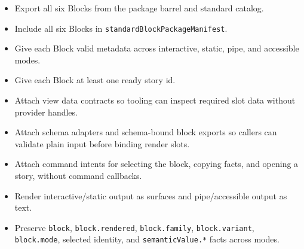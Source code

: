 \begin{itemize}
\tightlist
\item
  Export all six Blocks from the package barrel and standard catalog.
\item
  Include all six Blocks in \texttt{s\allowbreak{}t\allowbreak{}a\allowbreak{}n\allowbreak{}d\allowbreak{}a\allowbreak{}r\allowbreak{}d\allowbreak{}B\allowbreak{}l\allowbreak{}o\allowbreak{}c\allowbreak{}k\allowbreak{}P\allowbreak{}a\allowbreak{}c\allowbreak{}k\allowbreak{}a\allowbreak{}g\allowbreak{}e\allowbreak{}M\allowbreak{}a\allowbreak{}n\allowbreak{}i\allowbreak{}f\allowbreak{}e\allowbreak{}s\allowbreak{}t}.
\item
  Give each Block valid metadata across interactive, static, pipe, and accessible modes.
\item
  Give each Block at least one ready story id.
\item
  Attach view data contracts so tooling can inspect required slot data without provider handles.
\item
  Attach schema adapters and schema-bound block exports so callers can validate plain input before binding render slots.
\item
  Attach command intents for selecting the block, copying facts, and opening a story, without command callbacks.
\item
  Render interactive/static output as surfaces and pipe/accessible output as text.
\item
  Preserve \texttt{b\allowbreak{}l\allowbreak{}o\allowbreak{}c\allowbreak{}k}, \texttt{b\allowbreak{}l\allowbreak{}o\allowbreak{}c\allowbreak{}k\allowbreak{}.\allowbreak{}r\allowbreak{}e\allowbreak{}n\allowbreak{}d\allowbreak{}e\allowbreak{}r\allowbreak{}e\allowbreak{}d}, \texttt{b\allowbreak{}l\allowbreak{}o\allowbreak{}c\allowbreak{}k\allowbreak{}.\allowbreak{}f\allowbreak{}a\allowbreak{}m\allowbreak{}i\allowbreak{}l\allowbreak{}y}, \texttt{b\allowbreak{}l\allowbreak{}o\allowbreak{}c\allowbreak{}k\allowbreak{}.\allowbreak{}v\allowbreak{}a\allowbreak{}r\allowbreak{}i\allowbreak{}a\allowbreak{}n\allowbreak{}t}, \texttt{b\allowbreak{}l\allowbreak{}o\allowbreak{}c\allowbreak{}k\allowbreak{}.\allowbreak{}m\allowbreak{}o\allowbreak{}d\allowbreak{}e}, selected identity, and \texttt{s\allowbreak{}e\allowbreak{}m\allowbreak{}a\allowbreak{}n\allowbreak{}t\allowbreak{}i\allowbreak{}c\allowbreak{}V\allowbreak{}a\allowbreak{}l\allowbreak{}u\allowbreak{}e\allowbreak{}.\allowbreak{}*} facts across modes.
\end{itemize}

